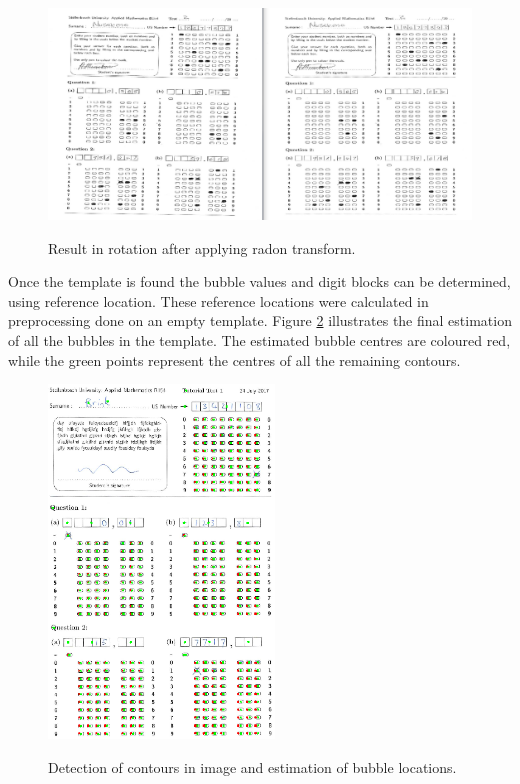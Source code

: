 \begin{figure}
  \centering
  \includegraphics[width=14cm]{Rotation}\\
  \caption{Result in rotation after applying radon transform.}
  \label{fig:rotate}
\end{figure}

Once the template is found the bubble values and digit blocks can be determined, using reference location. These reference locations were calculated in preprocessing done on an empty template. Figure \ref{fig:FinalEstimate} illustrates the final estimation of all the bubbles in the template. The estimated bubble centres are coloured red, while the green points represent the centres of all the remaining contours.

\begin{figure}
  \centering
  \includegraphics[width=6cm]{FinalEstimate}\\
  \caption{Detection of contours in image and estimation of bubble locations.}
  \label{fig:FinalEstimate}
\end{figure}

